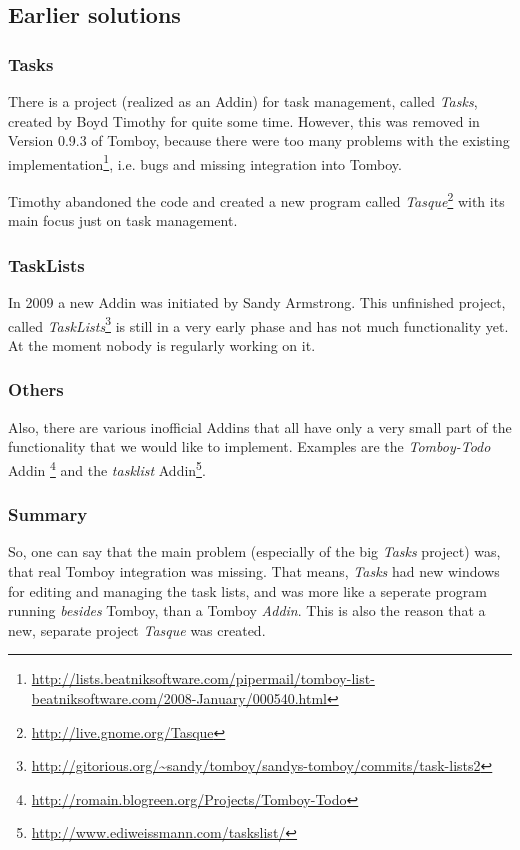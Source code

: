 \subsection{Earlier solutions}
\subsubsection{Tasks}
There is a project (realized as an Addin) for task management, called \textit{Tasks}, created by Boyd Timothy for quite some time. However, this was removed in Version 0.9.3 of Tomboy, because there were too many problems with the existing implementation\footnote{\url{http://lists.beatniksoftware.com/pipermail/tomboy-list-beatniksoftware.com/2008-January/000540.html}}, i.e. bugs and missing integration into Tomboy.

Timothy abandoned the code and created a new program called \textit{Tasque}\footnote{\url{http://live.gnome.org/Tasque}} with its main focus just on task management.

\subsubsection{TaskLists}
In 2009 a new Addin was initiated by Sandy Armstrong. This unfinished project, called \textit{TaskLists}\footnote{\url{http://gitorious.org/~sandy/tomboy/sandys-tomboy/commits/task-lists2}} is still in a very early phase and has not much functionality yet. At the moment nobody is regularly working on it.

\subsubsection{Others}
Also, there are various inofficial Addins that all have only a very small part of the functionality that we would like to implement. Examples are the \textit{Tomboy-Todo} Addin \footnote{\url{http://romain.blogreen.org/Projects/Tomboy-Todo}} and the \textit{tasklist} Addin\footnote{\url{http://www.ediweissmann.com/taskslist/}}.

\subsubsection{Summary}
\label{lessons}
So, one can say that the main problem (especially of the big \textit{Tasks} project) was, that real Tomboy integration was missing. That means, \textit{Tasks} had new windows for editing and managing the task lists, and was more like a seperate program running \textit{besides} Tomboy, than a Tomboy \textit{Addin}. This is also the reason that a new, separate project \textit{Tasque} was created.
